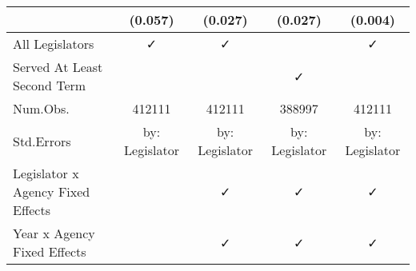 \begin{table}
\begin{tabular}[t]{lcccc}
 & (\num{0.057}) & (\num{0.027}) & (\num{0.027}) & (\num{0.004})\\
\midrule
All Legislators & ✓ & ✓ &  & ✓\\
Served At Least Second Term &  &  & ✓ & \\
Num.Obs. & \num{412111} & \num{412111} & \num{388997} & \num{412111}\\
Std.Errors & by: Legislator & by: Legislator & by: Legislator & by: Legislator\\
Legislator x Agency Fixed Effects &  & ✓ & ✓ & ✓\\
Year x Agency Fixed Effects &  & ✓ & ✓ & ✓\\
\bottomrule
\end{tabular}
\end{table}
